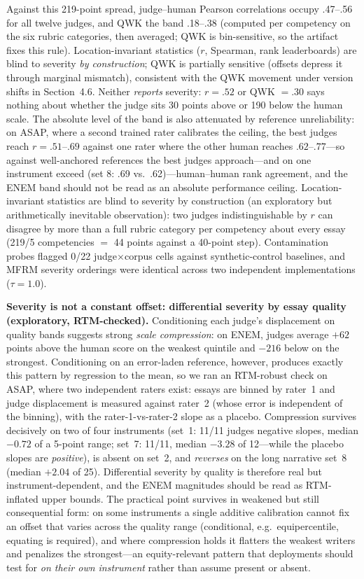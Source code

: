 \documentclass[fleqn,10pt]{JLA_article}
\begin{document}
Against this 219-point spread, judge--human Pearson correlations occupy .47--.56 for all twelve judges, and QWK the band .18--.38 (computed per competency on the six rubric categories, then averaged; QWK is bin-sensitive, so the artifact fixes this rule). Location-invariant statistics ($r$, Spearman, rank leaderboards) are blind to severity \emph{by construction}; QWK is partially sensitive (offsets depress it through marginal mismatch), consistent with the QWK movement under version shifts in Section~4.6. Neither \emph{reports} severity: $r{=}.52$ or QWK $=.30$ says nothing about whether the judge sits 30 points above or 190 below the human scale.
The absolute level of the band is also attenuated by reference unreliability: on ASAP, where a
second trained rater calibrates the ceiling, the best judges reach $r = .51$--$.69$ against one
rater where the other human reaches $.62$--$.77$---so against well-anchored references the best
judges approach---and on one instrument exceed (set 8: .69 vs.\ .62)---human--human rank agreement, and the ENEM band should not be
read as an absolute performance ceiling. Location-invariant statistics are blind to severity by construction (an
exploratory but arithmetically inevitable observation): two judges indistinguishable by $r$ can disagree by more than a full rubric category per competency about every essay (219/5 competencies $=$ 44 points against a 40-point step). Contamination probes flagged 0/22
judge$\times$corpus cells against synthetic-control baselines, and MFRM severity orderings were
identical across two independent implementations ($\tau=1.0$).


\medskip\noindent\textbf{Severity is not a constant offset: differential severity by
essay quality (exploratory, RTM-checked).} Conditioning each judge's displacement on quality
bands suggests strong \emph{scale compression}: on ENEM, judges average $+62$ points above the
human score on the weakest quintile and $-216$ below on the strongest. Conditioning on an
error-laden reference, however, produces exactly this pattern by regression to the mean, so we
ran an RTM-robust check on ASAP, where two independent raters exist: essays are binned by
rater~1 and judge displacement is measured against rater~2 (whose error is independent of the
binning), with the rater-1-vs-rater-2 slope as a placebo. Compression survives decisively on
two of four instruments (set~1: 11/11 judges negative slopes, median $-0.72$ of a 5-point
range; set~7: 11/11, median $-3.28$ of 12---while the placebo slopes are \emph{positive}), is
absent on set~2, and \emph{reverses} on the long narrative set~8 (median $+2.04$ of 25).
Differential severity by quality is therefore real but instrument-dependent, and the ENEM
magnitudes should be read as RTM-inflated upper bounds. The practical point survives in
weakened but still consequential form: on some instruments a single additive calibration
cannot fix an offset that varies across the quality range (conditional, e.g.\
equipercentile, equating is required), and where compression holds it flatters the weakest
writers and penalizes the strongest---an equity-relevant pattern that deployments should test
for \emph{on their own instrument} rather than assume present or absent.
\end{document}
